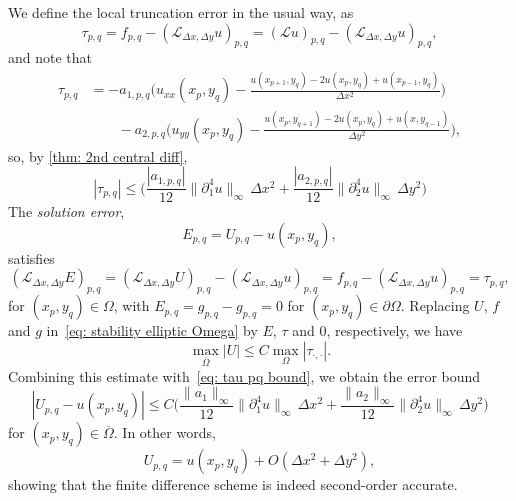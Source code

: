 We define the local truncation error in the usual way, as
\[
\tau_{p,q}=f_{p,q}-(\mathcal{L}_{\Delta x,\Delta y}u)_{p,q}
	=(\mathcal{L}u)_{p,q}-(\mathcal{L}_{\Delta x,\Delta y}u)_{p,q},
\]
and note that
\begin{equation}\label{eq: tau pq bound}
\begin{aligned}
\tau_{p,q}&=-a_{1,p,q}\biggl(u_{xx}(x_p,y_q)
	-\frac{u(x_{p+1},y_q)-2u(x_p,y_q)+u(x_{p-1},y_q)}{\Delta x^2}\biggr)\\
	&\qquad{}-a_{2,p,q}\biggl(u_{yy}(x_p,y_q)
	-\frac{u(x_p,y_{q+1})-2u(x_p,y_q)+u(x,y_{q-1})}{\Delta y^2}\biggr),
\end{aligned}
\end{equation}
so, by \cref{thm: 2nd central diff},
\begin{equation}\label{eq: tau pq bound}
|\tau_{p,q}|\le\biggl(
\frac{|a_{1,p,q}|}{12}\|\partial_1^4u\|_\infty\,\Delta x^2
+\frac{|a_{2,p,q}|}{12}\|\partial_2^4u\|_\infty\,\Delta y^2\biggr)
\end{equation}
The \emph{solution error},
\[
E_{p,q}=U_{p,q}-u(x_p,y_q),
\]
satisfies
\[
(\mathcal{L}_{\Delta x,\Delta y}E)_{p,q}
	=(\mathcal{L}_{\Delta x,\Delta y}U)_{p,q}
	-(\mathcal{L}_{\Delta x,\Delta y}u)_{p,q}
	=f_{p,q}-(\mathcal{L}_{\Delta x,\Delta y}u)_{p,q}=\tau_{p,q},
\]
for $(x_p,y_q)\in\Omega$, with $E_{p,q}=g_{p,q}-g_{p,q}=0$
for $(x_p,y_q)\in\partial\Omega$.  Replacing $U$, $f$ and $g$ 
in~\eqref{eq: stability elliptic Omega} by $E$, $\tau$ and $0$, respectively,
we have
\[
\max_{\overline{\Omega}}|U|\le C\max_\Omega|\tau_{\cdot,\cdot}|.
\]
Combining this estimate with~\eqref{eq: tau pq bound}, we obtain the error
bound
\[
|U_{p,q}-u(x_p,y_q)|\le C\biggl(
\frac{\|a_1\|_\infty}{12}\|\partial_1^4u\|_\infty\,\Delta x^2
+\frac{\|a_2\|_\infty}{12}\|\partial_2^4u\|_\infty\,\Delta y^2\biggr)
\]
for $(x_p,y_q)\in\overline{\Omega}$.  In other words,
\[
U_{p,q}=u(x_p,y_q)+O(\Delta x^2+\Delta y^2),
\]
showing that the finite difference scheme is indeed second-order 
accurate.

